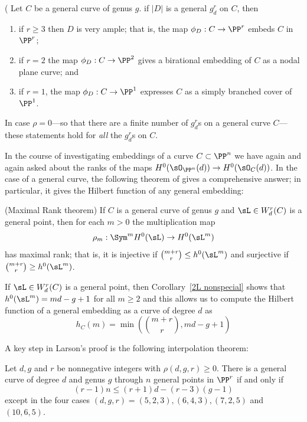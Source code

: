 \begin{theorem}\label{grd omnibus}(\cite[Proposition 5.4]{Eisenbud-Harris83}
Let $C$ be a general curve of genus $g$.
 if $|D|$ is a general $g^r_d$ on $C$, then

 \begin{enumerate}
\item if $r \geq 3$ then $D$ is very ample; that is, the map $\phi_D : C \to \PP^r$   embeds $C$ in $\PP^r$;
\item if $r=2$ the map $\phi_D : C \to \PP^2$ gives a birational embedding of $C$ as a nodal plane curve; and 
\item if $r=1$, the map $\phi_D : C \to \PP^1$ expresses $C$ as a simply branched cover of $\PP^1$.
\end{enumerate}
\end{theorem}

In case $\rho = 0$---so that there are a finite number of $g^r_d$s on a general curve $C$---these statements hold for \emph{all} the $g^r_d$s on $C$.

In the course of investigating embeddings of a curve $C\subset \PP^n$ we have again and again
asked about the ranks of the maps $H^0(\sO_{\PP^n}(d)) \to H^0(\sO_C(d))$. In the case of
a general curve, the following theorem of \cite{ELarson2018} gives a comprehensive answer; in particular, it gives
 the Hilbert function of any general embedding:
 
\begin{theorem}[Larson](Maximal Rank theorem)\label{maximal rank}
If $C$ is a general curve of genus $g$ and $\sL  \in W^r_d(C)$ is a general point, then for each $m > 0$ the multiplication map
$$
\rho_m : \Sym^m H^0(\sL ) \to H^0(\sL ^m)
$$
has maximal rank; that is, it is injective if $\binom{m+r}{r} \leq h^0(\sL ^m)$ and surjective if $\binom{m+r}{r} \geq h^0(\sL ^m)$.
\end{theorem}


If $\sL\in W^r_d(C)$ is a general point, then Corollary~\ref{2L nonspecial} shows that 
$h^0(\sL ^m) = md-g+1$ for all $m \geq 2$
and this allows us to compute the Hilbert function of a general embedding as a curve
of degree $d$ as 
 $$
 h_C(m) = \min(\binom{m+r}{r} , md-g+1)
 $$
 


A key step in Larson's proof is the following interpolation theorem:

\begin{theorem}\label{Larson-Vogt}
Let $d, g$ and $r$
be nonnegative integers with $\rho(d, g, r) \geq 0$. There is a general curve of degree $d$ and genus $g$ through $n$ general
points in $\PP^r$
if and only if
$$
(r-1)n \leq (r + 1)d-(r-3)(g-1)
$$
except in the four cases $(d, g, r) = (5, 2, 3),(6, 4, 3),(7, 2, 5)$ and $(10, 6, 5)$.

 \end{theorem}
 
